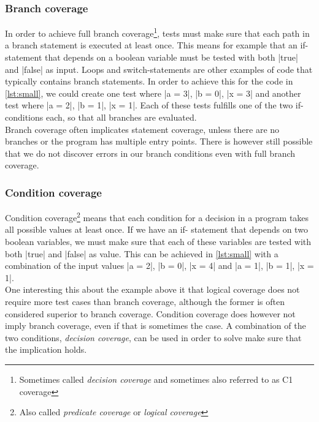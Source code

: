 \subsubsection{Branch coverage}

In order to achieve full branch coverage\footnote{Sometimes called
\emph{decision coverage} and sometimes also referred to as C1 coverage},
tests must make sure that each path in a branch statement is executed at
least once. This means for example that an if-statement that depends on
a boolean variable must be tested with both |true| and |false| as input.
Loops and switch-statements are other examples of code that typically
contains branch statements. In order to achieve this for the code in
\ref{lst:small}, we could create one test where |a = 3|, |b = 0|,
|x = 3| and another test where |a = 2|, |b = 1|, |x = 1|. Each of these
tests fulfills one of the two if-conditions each, so that all branches
are evaluated.\\

Branch coverage often implicates statement coverage, unless there are no
branches or the program has multiple entry points. There is however
still possible that we do not discover errors in our branch conditions
even with full branch coverage.\\


\subsubsection{Condition coverage}

Condition coverage\footnote{Also called \emph{predicate coverage} or
\emph{logical coverage}} means that each condition for a decision in a
program takes all possible values at least once. If we have an if-
statement that depends on two boolean variables, we must make sure that
each of these variables are tested with both |true| and |false| as
value. This can be achieved in \ref{lst:small} with a combination of
the input values |a = 2|, |b = 0|, |x = 4| and |a = 1|, |b = 1|,
|x = 1|.\\

One interesting this about the example above it that logical coverage
does not require more test cases than branch coverage, although the
former is often considered superior to branch coverage. Condition
coverage does however not imply branch coverage, even if that is
sometimes the case. A combination of the two conditions,
\emph{decision coverage}, can be used in order to solve make
sure that the implication holds.\\


